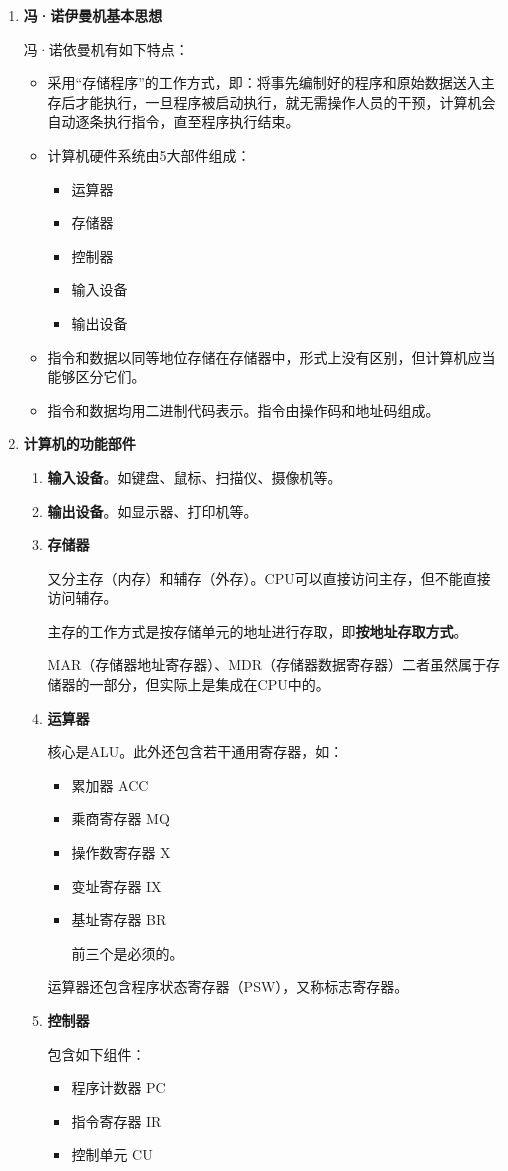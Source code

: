 \documentclass[12pt, a4paper, oneside]{ctexart}
\begin{document}
\begin{enumerate}
  \item {\bf 冯·诺伊曼机基本思想}
  
  冯·诺依曼机有如下特点：
  \begin{itemize}
    \item 采用“存储程序”的工作方式，即：将事先编制好的程序和原始数据送入主存后才能执行，一旦程序被启动执行，就无需操作人员的干预，计算机会自动逐条执行指令，直至程序执行结束。
    \item 计算机硬件系统由5大部件组成：
    \begin{itemize}
      \item 运算器
      \item 存储器
      \item 控制器
      \item 输入设备
      \item 输出设备
    \end{itemize}
    \item 指令和数据以同等地位存储在存储器中，形式上没有区别，但计算机应当能够区分它们。
    \item 指令和数据均用二进制代码表示。指令由操作码和地址码组成。
  \end{itemize}
  \item {\bf 计算机的功能部件}
  \begin{enumerate}
    \item {\bf 输入设备}。如键盘、鼠标、扫描仪、摄像机等。
    \item {\bf 输出设备}。如显示器、打印机等。
    \item {\bf 存储器}
    
    又分主存（内存）和辅存（外存）。CPU可以直接访问主存，但不能直接访问辅存。
    
    主存的工作方式是按存储单元的地址进行存取，即\textbf{按地址存取方式}。

    MAR（存储器地址寄存器）、MDR（存储器数据寄存器）二者虽然属于存储器的一部分，但实际上是集成在CPU中的。
    \item {\bf 运算器}
    
    核心是ALU。此外还包含若干通用寄存器，如：
    \begin{itemize}
      \item 累加器 ACC
      \item 乘商寄存器 MQ
      \item 操作数寄存器 X
      \item 变址寄存器 IX
      \item 基址寄存器 BR
      
      前三个是必须的。
    \end{itemize}
    运算器还包含程序状态寄存器（PSW），又称标志寄存器。
    \item {\bf 控制器}
    
    包含如下组件：
    \begin{itemize}
      \item 程序计数器 PC
      \item 指令寄存器 IR
      \item 控制单元 CU
    \end{itemize}
  \end{enumerate}
\end{enumerate}
\end{document}
